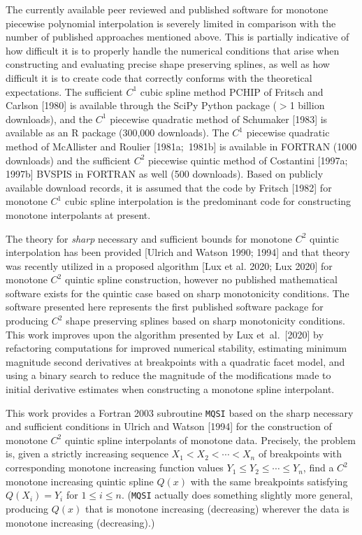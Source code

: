 The currently available peer reviewed and published software for
monotone piecewise polynomial interpolation is severely limited in
comparison with the number of published approaches mentioned
above. This is partially indicative of how difficult it is to properly
handle the numerical conditions that arise when constructing and
evaluating precise shape preserving splines, as well as how difficult
it is to create code that correctly conforms with the theoretical
expectations. The sufficient $C^1$ cubic spline method PCHIP of
Fritsch and Carlson [1980] is available through the SciPy Python
package ($>$1 billion downloads), and the $C^1$ piecewise quadratic
method of Schumaker [1983] is available as an R package (300,000
downloads). The $C^1$ piecewise quadratic method of McAllister and
Roulier [1981a;\ 1981b] is available in FORTRAN (1000 downloads) and
the sufficient $C^2$ piecewise quintic method of Costantini [1997a;
  1997b] BVSPIS in FORTRAN as well (500 downloads). Based on publicly
available download records, it is assumed that the code by Fritsch
[1982] for monotone $C^1$ cubic spline interpolation is the
predominant code for constructing monotone interpolants at present.

The theory for {\it sharp} necessary and sufficient bounds for
monotone $C^2$ quintic interpolation has been provided [Ulrich and
  Watson 1990; 1994] and that theory was recently utilized in a
proposed algorithm [Lux et al. 2020; Lux 2020] for monotone $C^2$
quintic spline construction, however no published mathematical
software exists for the quintic case based on sharp monotonicity
conditions. The software presented here represents the first published
software package for producing $C^2$ shape preserving splines
based on sharp monotonicity conditions. This work improves upon
the algorithm presented by Lux et\ al.\ [2020] by refactoring
computations for improved numerical stability, estimating minimum
magnitude second derivatives at breakpoints with a quadratic facet
model, and using a binary search to reduce the magnitude of the
modifications made to initial derivative estimates when constructing a
monotone spline interpolant.

This work provides a Fortran 2003 subroutine {\tt MQSI} based on the
sharp necessary and sufficient conditions in Ulrich and Watson [1994]
for the construction of monotone $C^2$ quintic spline interpolants of
monotone data. Precisely, the problem is, given a strictly increasing
sequence $X_1<X_2< \cdots <X_n$ of breakpoints with corresponding
monotone increasing function values $Y_1\le Y_2\le \cdots \le Y_n$,
find a $C^2$ monotone increasing quintic spline $Q(x)$ with the same
breakpoints satisfying $Q(X_i)=Y_i$ for $1\le i\le n$. ({\tt MQSI}
actually does something slightly more general, producing $Q(x)$ that
is monotone increasing (decreasing) wherever the data is monotone
increasing (decreasing).)


